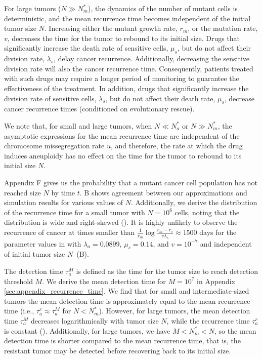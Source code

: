 \documentclass[12pt]{extarticle}
\renewcommand{\Delta}{r}
\begin{document}
For large tumors ($N \gg N_m^*$), the dynamics of the number of mutant cells is deterministic, and the mean recurrence time becomes independent of the initial tumor size $N$.
Increasing either the mutant growth rate, $\Delta_m$, or the mutation rate, $v$, decreases the time for the tumor to rebound to its initial size.
Drugs that significantly increase the death rate of sensitive cells, $\mu_s$, but do not affect their division rate, $\lambda_s$, delay cancer recurrence. Additionally, decreasing the sensitive division rate will also the cancer recurrence time. Consequently, patients treated with such drugs may require a longer period of monitoring to guarantee the effectiveness of the treatment. %
In addition, drugs that significantly increase the division rate of sensitive cells, $\lambda_s$, but do not affect their death rate, $\mu_s$, decrease cancer recurrence times (conditioned on evolutionary rescue). 

We note that, for small and large tumors, when $N \ll N_a^*$ or $N \gg N_m^*$, the asymptotic expressions for the mean recurrence time are independent of the chromosome missegregation rate $u$, and therefore, the rate at which the drug induces aneuploidy has no effect on the time for the tumor to rebound to its initial size $N$.

Appendix F gives us the probability that a mutant cancer cell population has not reached size $N$ by time $t$. B shows agreement between our approximations and simulation results for various values of $N$. Additionally, we derive the distribution of the recurrence time for a small tumor with $N=10^6$ cells, noting that the distribution is wide and right-skewed (). It is highly unlikely to observe the recurrence of cancer at times smaller than $\frac{1}{\Delta_m}\log\frac{\Delta_m-\Delta_s}{v\lambda_s}\approx 1500$ days for the parameter values in  with $\lambda_a=0.0899$, $\mu_s=0.14$, and $v=10^{-7}$ and independent of initial tumor size $N$~(B). 

The detection time $\tau_a^{M}$ is defined as the time for the tumor size to reach detection threshold $M$. We derive the mean detection time for $M=10^7$ in Appendix \ref{sec:appendix_recurrence_time}. We find that for small and intermediate-sized tumors the mean detection time is approximately equal to the mean recurrence time (i.e., $\tau_a^r\approx\tau_a^{M}$ for $N<N_m^*$). %
However, for large tumors, the mean detection time $\tau_a^{M}$ decreases logarithmically with tumor size $N$, while the recurrence time $\tau_a^{r}$ is constant (). Additionally, for large tumors, we have $M<N_m^*<N$, so the mean detection time is shorter compared to the mean recurrence time, that is, the resistant tumor may be detected before recovering back to its initial size.
\end{document}
